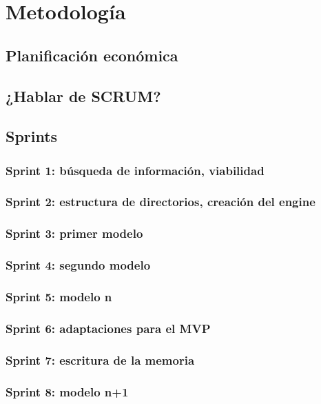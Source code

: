 
\chapter{Metodología}
\label{chap:metodologia}

\section{Planificación económica}

\section{¿Hablar de SCRUM?}

\section{Sprints}

\subsection{Sprint 1: búsqueda de información, viabilidad}
\subsection{Sprint 2: estructura de directorios, creación del engine}
\subsection{Sprint 3: primer modelo}
\subsection{Sprint 4: segundo modelo}
\subsection{Sprint 5: modelo n}
\subsection{Sprint 6: adaptaciones para el MVP}
\subsection{Sprint 7: escritura de la memoria}
\subsection{Sprint 8: modelo n+1}


